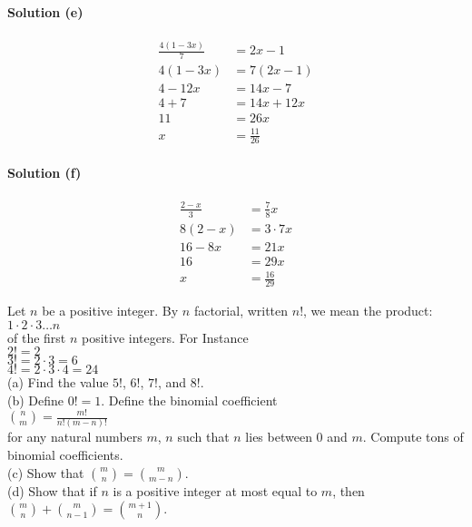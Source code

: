 \documentclass[6pt]{article}
\begin{document}
\paragraph{Solution (e)}
\begin{align*}
\frac{4(1-3x)}{7} &= 2x - 1 \\
4(1 - 3x) &= 7(2x - 1) \\
4 - 12x &= 14x - 7 \\
4 + 7 &= 14x + 12x \\
11 &= 26x \\
x &= \frac{11}{26}
\end{align*}

\paragraph{Solution (f)}
\begin{align*}
\frac{2 - x}{3} &= \frac{7}{8}x \\
8(2 - x) &= 3 \cdot 7x \\
16 - 8x &= 21x \\
16 &= 29x \\
x &= \frac{16}{29}
\end{align*}


\begin{tcolorbox}[title=Problem 6, breakable]
Let $n$ be a positive integer. By $n$ factorial, written $n!$, we mean the product: \\
$1 \cdot 2 \cdot 3 \ldots n$ \\
of the first $n$ positive integers. For Instance \\
$2! = 2$ \\
$3! = 2 \cdot 3 = 6 $ \\
$4! = 2 \cdot 3 \cdot 4 = 24$ \\
(a) Find the value $5!$, $6!$, $7!$, and $8!$. \\
(b) Define $0! = 1$. Define the binomial coefficient \\
$\binom{n}{m} = \frac{m!}{n!(m-n)!}$ \\
for any natural numbers $m$, $n$ such that $n$ lies between $0$ and $m$.
Compute tons of binomial coefficients. \\
(c) Show that $\binom{m}{n} = \binom{m}{m - n}$. \\
(d) Show that if $n$ is a positive integer at most equal to $m$, then \\
$\binom{m}{n} + \binom{m}{n - 1} = \binom{m + 1}{n}$.
\end{tcolorbox}
\end{document}
